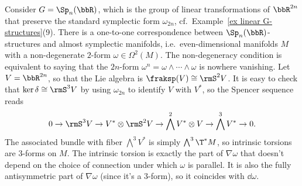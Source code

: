 \begin{example}\label{ex almost symplectic structures}
    Consider $G=\Sp_n(\bbR)$, which is the group of linear transformations of $\bbR^{2n}$ that preserve the standard symplectic form $\omega_{2n}$, cf.\ Example~\ref{ex linear G-structures}(9). There is a one-to-one correspondence between $\Sp_n(\bbR)$-structures and almost symplectic manifolds, i.e.\ even-dimensional manifolds $M$ with a non-degenerate $2$-form $\omega\in \Omega^2(M)$. The non-degeneracy condition is equivalent to saying that the $2n$-form $\omega^n=\omega\wedge\cdots\wedge\omega$ is nowhere vanishing.
    Let $V=\bbR^{2n}$, so that the Lie algebra is $\fraksp(V)\cong \rmS^2 V$. It is easy to check that $\ker\delta\cong \rmS^3 V$ by using $\omega_{2n}$ to identify $V$ with $V^\ast$, so the Spencer sequence reads 
    \[0\to \rmS^3 V\to V^\ast \otimes \rmS^2V\to \bigwedge^2 V^\ast\otimes V\to \bigwedge^3 V^\ast\to 0.\]
    The associated bundle with fiber $\bigwedge^3 V^\ast$ is simply $\bigwedge^3 \T^\ast M$, so intrinsic torsions are $3$-forms on $M$. The intrinsic torsion is exactly the part of $\nabla\omega$ that doesn't depend on the choice of connection under which $\omega$ is parallel. It is also the fully antisymmetric part of $\nabla\omega$ (since it's a $3$-form), so it coincides with $\dd\omega$.


\end{example}
